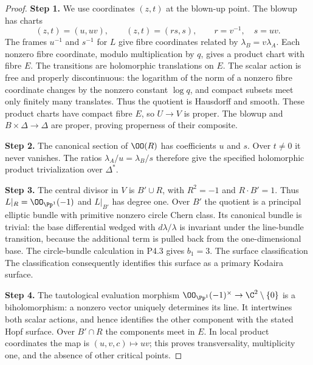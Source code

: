 \begin{proof}
\noindent\textbf{Step 1.} We use coordinates $(z,t)$ at the blown-up point. The blowup has charts
\[
 (z,t)=(u,uv),\qquad (z,t)=(rs,s),\qquad r=v^{-1},\quad s=uv.
\]
The frames $u^{-1}$ and $s^{-1}$ for $L$ give fibre coordinates related by
$\lambda_B=v\lambda_A$. Each nonzero fibre coordinate, modulo multiplication
by $q$, gives a product chart with fibre $E$. The transitions are holomorphic
translations on $E$. The scalar action is free and properly discontinuous:
the logarithm of the norm of a nonzero fibre coordinate changes by the
nonzero constant $\log q$, and compact subsets meet only finitely many
translates. Thus the quotient is Hausdorff and smooth. These product charts
have compact fibre $E$, so $U\to V$ is proper. The blowup and $B\times\Delta
\to\Delta$ are proper, proving properness of their composite.

\noindent\textbf{Step 2.} The canonical section of $\OO(R)$ has coefficients $u$ and $s$. Over
$t\ne0$ it never vanishes. The ratios $\lambda_A/u=\lambda_B/s$ therefore
give the specified holomorphic product trivialization over $\Delta^*$.

\noindent\textbf{Step 3.} The central divisor in $V$ is $B'\cup R$, with $R^2=-1$ and $R\cdot B'=1$.
Thus $L|_R=\OO_{\Pp^1}(-1)$ and $L|_{B'}$ has degree one. Over $B'$ the
quotient is a principal elliptic bundle with primitive nonzero circle Chern
class. Its canonical bundle is trivial: the base differential wedged with
$d\lambda/\lambda$ is invariant under the line-bundle transition, because
the additional term is pulled back from the one-dimensional base. The
circle-bundle calculation in P4.3 gives $b_1=3$. The surface classification
The classification \cite[Chapter~VI, Theorem~1.1 and Table~10, pp.~243--244]{BHPV2004E} consequently identifies this surface as
a primary Kodaira surface.

\noindent\textbf{Step 4.} The tautological evaluation morphism
$\OO_{\Pp^1}(-1)^\times\to\C^2\setminus\{0\}$ is a biholomorphism: a
nonzero vector uniquely determines its line. It intertwines both scalar
actions, and hence identifies the other component with the stated Hopf
surface. Over $B'\cap R$ the components meet in $E$. In local product
coordinates the map is $(u,v,c)\mapsto uv$; this proves transversality,
multiplicity one, and the absence of other critical points.
\end{proof}

